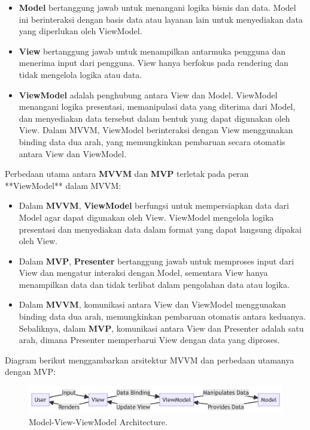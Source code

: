 \begin{itemize}
	\item \textbf{Model} bertanggung jawab untuk menangani logika bisnis dan data. Model ini berinteraksi dengan basis data atau layanan lain untuk menyediakan data yang diperlukan oleh ViewModel.
	\item \textbf{View} bertanggung jawab untuk menampilkan antarmuka pengguna dan menerima input dari pengguna. View hanya berfokus pada rendering dan tidak mengelola logika atau data.
	\item \textbf{ViewModel} adalah penghubung antara View dan Model. ViewModel menangani logika presentasi, memanipulasi data yang diterima dari Model, dan menyediakan data tersebut dalam bentuk yang dapat digunakan oleh View. Dalam MVVM, ViewModel berinteraksi dengan View menggunakan binding data dua arah, yang memungkinkan pembaruan secara otomatis antara View dan ViewModel.
\end{itemize}

Perbedaan utama antara \textbf{MVVM} dan \textbf{MVP} terletak pada peran **ViewModel** dalam MVVM:
\begin{itemize}
	\item Dalam \textbf{MVVM}, \textbf{ViewModel} berfungsi untuk mempersiapkan data dari Model agar dapat digunakan oleh View. ViewModel mengelola logika presentasi dan menyediakan data dalam format yang dapat langsung dipakai oleh View.
	\item Dalam \textbf{MVP}, \textbf{Presenter} bertanggung jawab untuk memproses input dari View dan mengatur interaksi dengan Model, sementara View hanya menampilkan data dan tidak terlibat dalam pengolahan data atau logika.
	\item Dalam \textbf{MVVM}, komunikasi antara View dan ViewModel menggunakan binding data dua arah, memungkinkan pembaruan otomatis antara keduanya. Sebaliknya, dalam \textbf{MVP}, komunikasi antara View dan Presenter adalah satu arah, dimana Presenter memperbarui View dengan data yang diproses.
\end{itemize}

Diagram berikut menggambarkan arsitektur MVVM dan perbedaan utamanya dengan MVP:

\begin{figure}[h]
	\centering
	\includegraphics[width=\textwidth]{../images/mvvm.png}
	\caption{Model-View-ViewModel Architecture.}
	\label{fig:mvvm-architecture}
\end{figure}

